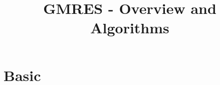 \documentclass{article}
\title{GMRES - Overview and Algorithms}
\author{}
\date{}
\begin{document}
\maketitle

\section{Basic}

\end{document}
